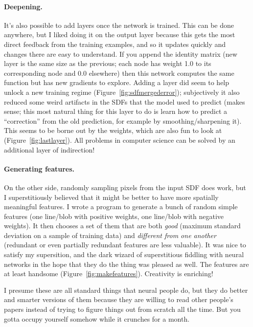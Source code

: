 \documentclass[twocolumn]{article}
\begin{document}
\paragraph{Deepening.} It's also possible to add layers once the
network is trained. This can be done anywhere, but I liked doing it on
the output layer because this gets the most direct feedback from the
training examples, and so it updates quickly and changes there are
easy to understand. If you append the identity matrix (new layer is
the same size as the previous; each node has weight 1.0 to its
corresponding node and 0.0 elsewhere) then this network computes
the same function but has new gradients to explore. Adding a layer
did seem to help unlock a new training regime
(Figure~\ref{fig:sdfmergederror}); subjectively it also reduced
some weird artifacts in the SDFs that the model used to predict (makes
sense; this most natural thing for this layer to do is learn how to
predict a ``correction'' from the old prediction, for example
by smoothing/sharpening it). This seems to be borne out by the
weights, which are also fun to look at (Figure~\ref{fig:lastlayer}).
All problems in computer science can be solved by an additional
layer of indirection!

\paragraph{Generating features.} On the other side, randomly sampling
pixels from the input SDF does work, but I superstitiously believed
that it might be better to have more spatially meaningful features. I
wrote a program to generate a bunch of random simple features (one
line/blob with positive weights, one line/blob with negative weights).
It then chooses a set of them that are both {\em good} (maximum
standard deviation on a sample of training data) and {\em different
  from one another} (redundant or even partially redundant features
are less valuable). It was nice to satisfy my supersition, and the
dark wizard of superstitious fiddling with neural networks in the
hope that they do the thing was pleased as well. The features are
at least handsome (Figure~\ref{fig:makefeatures}). Creativity is
enriching!

I presume these are all standard things that neural people do, but they
do better and smarter versions of them because they are willing to
read other people's papers instead of trying to figure things out from
scratch all the time. But you gotta occupy yourself somehow while it
crunches for a month.
\end{document}
